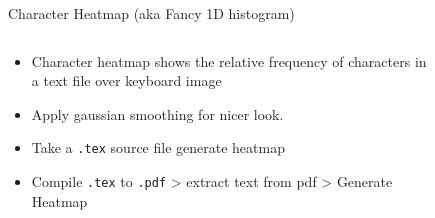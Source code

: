 \documentclass[aspectratio=169]{beamer}
\begin{document}
\begin{frame}{Character Heatmap (aka Fancy 1D histogram)}
    \begin{columns}
        \begin{column}{0.49\textwidth}
            \begin{itemize}
                \item Character heatmap shows the relative frequency of characters in a text file over keyboard image
                \item Apply gaussian smoothing for nicer look.
                \item Take a \texttt{.tex} source file generate heatmap
                \item Compile \texttt{.tex} to \texttt{.pdf} > extract text from pdf > Generate Heatmap
            \end{itemize}
        \end{column}
        \begin{column}{0.49\textwidth}
            \begin{figure}[h!]
                \centering
            \end{figure}
        \end{column}
    \end{columns}
\end{frame} 
\end{document}
